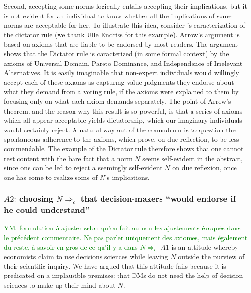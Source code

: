 \documentclass[preprint, french, english, 11pt, authoryear]{elsarticle}%
\newcommand{\protectforpdf}[1]{\texorpdfstring{\ensuremath{#1}}{#1}}
\newcommand{\commentYM}[1]{\textcolor{green}{YM: #1}}
\begin{document}
Second, accepting some norms logically entails accepting their implications, but it is not evident for an individual to know whether all the implications of some norms are acceptable for her. To illustrate this idea, consider \citeauthor{arrow_social_2012}’s \citeyearpar{arrow_social_2012} caracterization of the dictator rule (we thank Ulle Endriss for this example). Arrow's argument is based on axioms that are liable to be endorsed by most readers. The argument shows that the Dictator rule is caracterized (in some formal context) by the axioms of Universal Domain, Pareto Dominance, and Independence of Irrelevant Alternatives. It is easily imaginable that non-expert individuals would willingly accept each of these axioms as capturing value-judgments they endorse about what they demand from a voting rule, if the axioms were explained to them by focusing only on what each axiom demands separately. The point of Arrow's theorem, and the reason why this result is so powerful, is that a series of axioms which all appear acceptable yields dictatorship, which our imaginary individuals would certainly reject. A natural way out of the conundrum is to question the spontaneous adherence to the axioms, which prove, on due reflection, to be less commendable. The example of the Dictator rule therefore shows that one cannot rest content with the bare fact that a norm $N$ seems self-evident in the abstract, since one can be led to reject a seemingly self-evident $N$ on due reflexion, once one has come to realize some of $N$'s implications.

\subsubsection{\protectforpdf{A2}: choosing \protectforpdf{N⇒_c} that decision-makers “would endorse if he could understand”}\commentYM{formulation à ajuster selon qu'on fait ou non les ajustements évoqués dans le précédent commentaire. Ne pas parler uniquement des axiomes, mais également du reste, à savoir en gros de ce qu'il y a dans $N⇒_c$}
$A1$ is an attitude whereby economists claim to use decisions sciences while leaving $N$ outside the purview of their scientific inquiry. We have argued that this attitude fails because it is predicated on a implausible premisse: that \acp{DM} do not need the help of decision sciences to make up their mind about $N$. 
\end{document}
